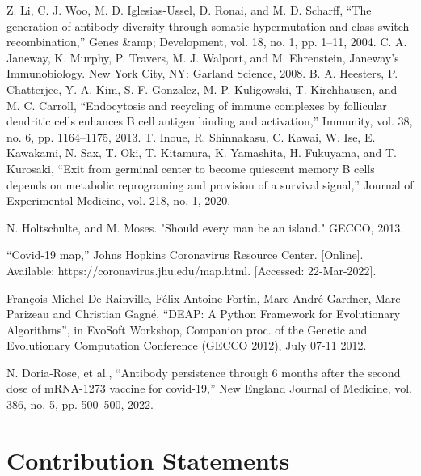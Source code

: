 \documentclass[conference]{IEEEtran}
\begin{document}


\begin{thebibliography}{00}

 Z. Li, C. J. Woo, M. D. Iglesias-Ussel, D. Ronai, and M. D. Scharff, “The generation of antibody diversity through somatic hypermutation and class switch recombination,” Genes &amp; Development, vol. 18, no. 1, pp. 1–11, 2004. 
 C. A. Janeway, K. Murphy, P. Travers, M. J. Walport, and M. Ehrenstein, Janeway's Immunobiology. New York City, NY: Garland Science, 2008. 
 B. A. Heesters, P. Chatterjee, Y.-A. Kim, S. F. Gonzalez, M. P. Kuligowski, T. Kirchhausen, and M. C. Carroll, “Endocytosis and recycling of immune complexes by follicular dendritic cells enhances B cell antigen binding and activation,” Immunity, vol. 38, no. 6, pp. 1164–1175, 2013. 
 T. Inoue, R. Shinnakasu, C. Kawai, W. Ise, E. Kawakami, N. Sax, T. Oki, T. Kitamura, K. Yamashita, H. Fukuyama, and T. Kurosaki, “Exit from germinal center to become quiescent memory B cells depends on metabolic reprograming and provision of a survival signal,” Journal of Experimental Medicine, vol. 218, no. 1, 2020. 

 N. Holtschulte, and M. Moses. "Should every man be an island." GECCO, 2013.

 “Covid-19 map,” Johns Hopkins Coronavirus Resource Center. [Online]. Available: https://coronavirus.jhu.edu/map.html. [Accessed: 22-Mar-2022]. 

 François-Michel De Rainville, Félix-Antoine Fortin, Marc-André Gardner, Marc Parizeau and Christian Gagné, “DEAP: A Python Framework for Evolutionary Algorithms”, in EvoSoft Workshop, Companion proc. of the Genetic and Evolutionary Computation Conference (GECCO 2012), July 07-11 2012.

 N. Doria-Rose, et al., “Antibody persistence through 6 months after the second dose of mRNA-1273 vaccine for covid-19,” New England Journal of Medicine, vol. 386, no. 5, pp. 500–500, 2022. 

\end{thebibliography}

\section*{Contribution Statements}
\end{document}
